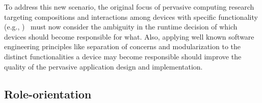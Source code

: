 To address this new scenario, the original focus of pervasive computing research targeting compositions and interactions among devices with specific functionality (e.g., )~\cite{} must now consider the ambiguity in the runtime decision of which devices should become responsible for what. %
Also, applying well known software engineering principles like separation of concerns and modularization to the distinct functionalities a device may become responsible should improve the quality of the pervasive application design and implementation. 









\subsection{Role-orientation}

